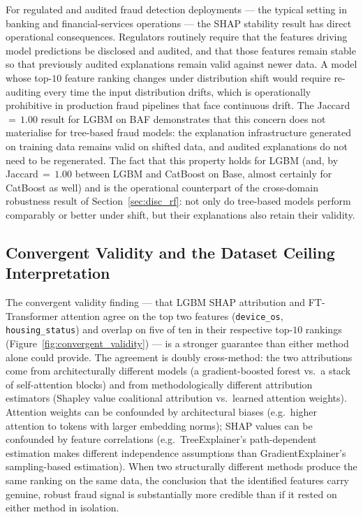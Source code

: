 \documentclass[a4paper,fleqn]{cas-sc}
\begin{document}
For regulated and audited fraud detection deployments --- the typical setting in
banking and financial-services operations --- the SHAP stability result has
direct operational consequences.
Regulators routinely require that the features driving model predictions be
disclosed and audited, and that those features remain stable so that previously
audited explanations remain valid against newer data.
A model whose top-$10$ feature ranking changes under distribution shift would
require re-auditing every time the input distribution drifts, which is
operationally prohibitive in production fraud pipelines that face continuous
drift.
The Jaccard\,$=\,1.00$ result for LGBM on BAF demonstrates that this concern
does not materialise for tree-based fraud models: the explanation infrastructure
generated on training data remains valid on shifted data, and audited
explanations do not need to be regenerated.
The fact that this property holds for LGBM (and, by Jaccard\,$=\,1.00$ between
LGBM and CatBoost on Base, almost certainly for CatBoost as well) and is the
operational counterpart of the cross-domain robustness result of
Section~\ref{sec:disc_rf}: not only do tree-based models perform comparably or
better under shift, but their explanations also retain their validity.

\subsection{Convergent Validity and the Dataset Ceiling Interpretation}
\label{sec:disc_ceiling}

The convergent validity finding --- that LGBM SHAP attribution and FT-Transformer
attention agree on the top two features (\texttt{device\_os},
\texttt{housing\_status}) and overlap on five of ten in their respective top-$10$
rankings (Figure~\ref{fig:convergent_validity}) --- is a stronger guarantee than
either method alone could provide.
The agreement is doubly cross-method: the two attributions come from
architecturally different models (a gradient-boosted forest vs.\ a stack of
self-attention blocks) and from methodologically different attribution
estimators (Shapley value coalitional attribution vs.\ learned attention weights).
Attention weights can be confounded by architectural biases (e.g.\ higher attention
to tokens with larger embedding norms); SHAP values can be confounded by feature
correlations (e.g.\ TreeExplainer's path-dependent estimation makes different
independence assumptions than GradientExplainer's sampling-based estimation).
When two structurally different methods produce the same ranking on the same data,
the conclusion that the identified features carry genuine, robust fraud signal is
substantially more credible than if it rested on either method in isolation.
\end{document}

